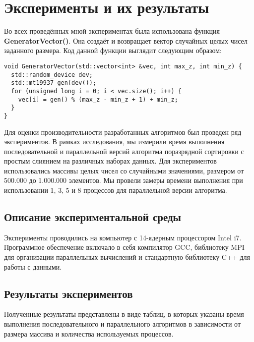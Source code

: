 \documentclass[a4paper, 14pt]{article}
\begin{document}
    
	\newpage
	\section*{\centering Эксперименты и их результаты}
	
	Во всех проведённых мной экспериментах была использована функция \textbf{GeneratorVector()}. Она создаёт и возвращает вектор случайных целых чисел заданного размера. Код данной функции выглядит следующим образом:
	\vspace{-1em}
	\begin{verbatim}
void GeneratorVector(std::vector<int> &vec, int max_z, int min_z) {
  std::random_device dev;
  std::mt19937 gen(dev());
  for (unsigned long i = 0; i < vec.size(); i++) {
    vec[i] = gen() % (max_z - min_z + 1) + min_z;
  }
}
	\end{verbatim}
\indent Для оценки производительности разработанных алгоритмов был проведен ряд экспериментов. В рамках исследования, мы измерили время выполнения последовательной и параллельной версий алгоритма поразрядной сортировки с простым слиянием на различных наборах данных. Для экспериментов использовались массивы целых чисел со случайными значениями, размером от 500.000 до 1.000.000 элементов. Мы провели замеры времени выполнения при использовании 1, 3, 5 и 8 процессов для параллельной версии алгоритма.

\subsection*{Описание экспериментальной среды}
\indent Эксперименты проводились на компьютер с 14-ядерным процессором Intel i7. Программное обеспечение включало в себя компилятор GCC, библиотеку MPI для организации параллельных вычислений и стандартную библиотеку C++ для работы с данными.

\subsection*{Результаты экспериментов}
\indent  Полученные результаты представлены в виде таблиц, в которых указаны время выполнения последовательного и параллельного алгоритмов в зависимости от размера массива и количества используемых процессов.
\end{document}
